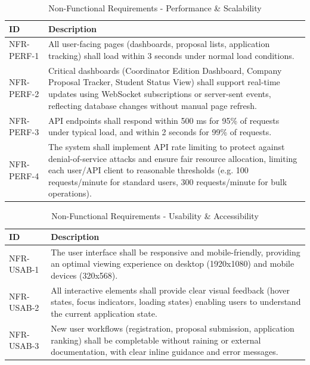 {
    \begin{table}[H]
        \centering
        \caption{Non-Functional Requirements - Performance \& Scalability}
        \begin{tabular}{|l|p{11cm}|} %
            \hline
            \textbf{ID} & \textbf{Description} \\ \hline
            NFR-PERF-1 & All user-facing pages (dashboards, proposal lists, application tracking) shall load within 3 seconds under normal load conditions. \\ \hline
            NFR-PERF-2 & Critical dashboards (Coordinator Edition Dashboard, Company Proposal Tracker, Student Status View) shall support real-time updates using WebSocket subscriptions or server-sent events, reflecting database changes without manual page refresh. \\ \hline
            NFR-PERF-3 & API endpoints shall respond within 500 ms for 95\% of requests under typical load, and within 2 seconds for 99\% of requests. \\ \hline
            NFR-PERF-4 & The system shall implement API rate limiting to protect against denial-of-service attacks and ensure fair resource allocation, limiting each user/API client to reasonable thresholds (e.g. 100 requests/minute for standard users, 300 requests/minute for bulk operations). \\ \hline
        \end{tabular}
    \end{table}    
}

{
    \begin{table}[H]
        \centering
        \caption{Non-Functional Requirements - Usability \& Accessibility}
        \begin{tabular}{|l|p{11cm}|} %
            \hline
            \textbf{ID} & \textbf{Description} \\ \hline
            NFR-USAB-1 & The user interface shall be responsive and mobile-friendly, providing an optimal viewing experience on desktop (1920x1080) and mobile devices (320x568). \\ \hline
            NFR-USAB-2 & All interactive elements shall provide clear visual feedback (hover states, focus indicators, loading states) enabling users to understand the current application state. \\ \hline
            NFR-USAB-3 & New user workflows (registration, proposal submission, application ranking) shall be completable without raining or external documentation, with clear inline guidance and error messages. \\ \hline
        \end{tabular}
    \end{table}    
}

